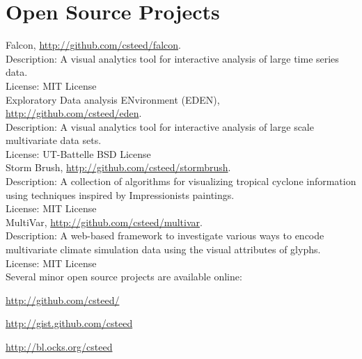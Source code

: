 \documentclass[11pt, letterpaper]{article}
\newcommand{\amper}{{\fontspec[Scale=.95]{Hoefler Text}\selectfont\itshape\&}}
\newcommand{\years}[1]{\marginnote{\scriptsize #1}}
\newenvironment{packed_itemize}{
\begin{itemize}
  \setlength{\itemsep}{1pt}
  \setlength{\parskip}{0pt}
  \setlength{\parsep}{0pt}
}{\end{itemize}}
\begin{document}
\section*{Open Source Projects}

\years{2016}Falcon,
\href{http://github.com/csteed/falcon}{http://github.com/csteed/falcon}.\\
Description: A visual analytics tool for interactive analysis of large time series data.\\
License: MIT License\\
\years{2012-2016}Exploratory Data analysis ENvironment (EDEN),
\href{http://github.com/csteed/eden}{http://github.com/csteed/eden}.\\
Description: A visual analytics tool for interactive analysis of large scale multivariate
data sets.\\
License: UT-Battelle BSD License\\
\years{2015}Storm Brush,
\href{http://github.com/csteed/stormbrush}{http://github.com/csteed/stormbrush}.\\
Description: A collection of algorithms for visualizing tropical cyclone
information using techniques inspired by Impressionists paintings.\\
License: MIT License\\
\years{2014}MultiVar,
\href{http://github.com/csteed/multivar}{http://github.com/csteed/multivar}.\\
Description: A web-based framework to investigate various ways to encode
multivariate climate simulation data using the visual attributes of glyphs.\\
License: MIT License\\

Several minor open source projects are available online:
\begin{packed_itemize}
\item \href{http://github.com/csteed/}{http://github.com/csteed/}
\item \href{http://gist.github.com/csteed}{http://gist.github.com/csteed}
\item \href{http://bl.ocks.org/csteed}{http://bl.ocks.org/csteed}
\end{packed_itemize}

\end{document}
